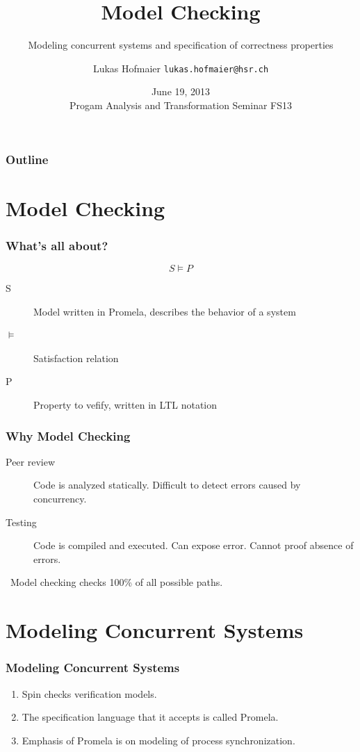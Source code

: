 \documentclass{beamer}
\title{Model Checking}
\subtitle{Modeling concurrent systems and specification of correctness properties}
\author{Lukas Hofmaier \texttt{lukas.hofmaier@hsr.ch}}
\date{June 19, 2013 \\ Progam Analysis and Transformation Seminar FS13}
\begin{document}
\maketitle
\begin{frame}
  \frametitle{Outline}
  \tableofcontents
\end{frame}

\section{Model Checking}

\begin{frame}
  \frametitle{What's all about?}
  \[
  S \models P
  \]
  \begin{description}
  \item[S] Model written in Promela, describes the behavior of a system
  \item[$\models$] Satisfaction relation
  \item[P] Property to vefify, written in LTL notation
  \end{description}
\end{frame}

\begin{frame}
  \frametitle{Why Model Checking}
  \begin{description}
  \item[Peer review] Code is analyzed statically. Difficult to detect errors caused by concurrency.
  \item[Testing] Code is compiled and executed. Can expose error. Cannot proof absence of errors.
  \end{description}\
Model checking checks 100\% of all possible paths.
\end{frame}

\section{Modeling Concurrent Systems}

\begin{frame}
  \frametitle{Modeling Concurrent Systems}
  \begin{enumerate}
  \item   Spin checks verification models.
  \item The specification language that it accepts is called Promela.
  \item Emphasis of Promela is on modeling of process synchronization.
  \end{enumerate}
\end{frame}
\end{document}
